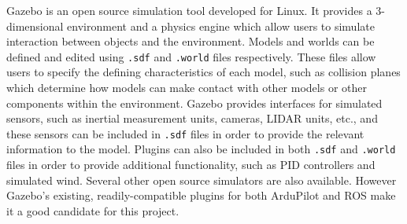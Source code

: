 Gazebo \cite{gazebo} is an open source simulation tool developed for Linux. It provides a 3-dimensional environment and a physics engine which allow users to simulate interaction between objects and the environment. Models and worlds can be defined and edited using \texttt{.sdf} and \texttt{.world} files respectively. These files allow users to specify the defining characteristics of each model, such as collision planes which determine how models can make contact with other models or other components within the environment.  Gazebo provides interfaces for simulated sensors, such as inertial measurement units, cameras, LIDAR units, etc., and these sensors can be included in \texttt{.sdf} files in order to provide the relevant information to the model. Plugins can also be included in both \texttt{.sdf} and \texttt{.world} files in order to provide additional functionality, such as \gls{PID} controllers and simulated wind. Several other open source simulators are also available. However Gazebo's existing, readily-compatible plugins for both ArduPilot and ROS make it a good candidate for this project.